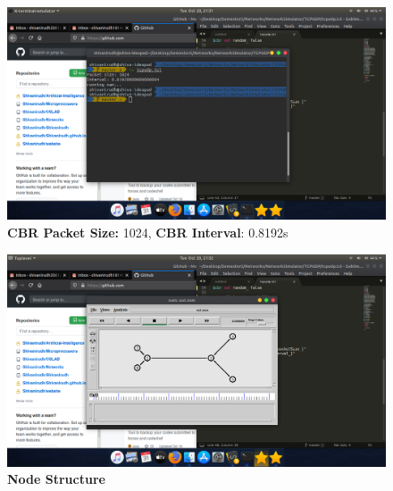 \documentclass[12pt,letterpaper]{article}
\begin{document}
\begin{flushleft}
\subsection*{}
\begin{figure}[h]
    \centering
    \includegraphics[trim = 100mm 50mm 125mm 70mm, clip, width = \textwidth]{Pics/TerminalRun.png}
    \caption{ \textbf{CBR Packet Size:} 1024, \textbf{CBR Interval}: 0.8192s}
\end{figure}
\begin{figure}[t]
    \centering
    \includegraphics[trim = 100mm 50mm 135mm 70mm, clip, width = \textwidth]{Pics/NodeGraph.png}
    \caption{\textbf{Node Structure}}


\end{figure}
\end{flushleft}
\end{document}
